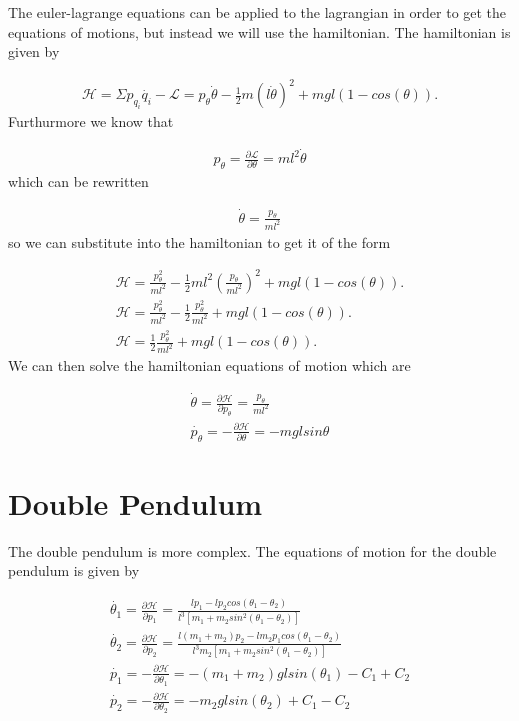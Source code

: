 \documentclass[12pt]{article}
\begin{document}
The euler-lagrange equations can be applied to the lagrangian in order to get the equations of motions, but instead we will use the hamiltonian. The hamiltonian is given by

\begin{gather}
\mathcal{H} = \Sigma p_{q_i} \dot{q_i} - \mathcal{L} =p_{\theta}\dot{\theta} - \frac{1}{2}m{(l\dot{\theta})}^2 + mgl(1 - cos(\theta)).
\end{gather}
Furthurmore we know that

\begin{gather}
p_{\theta} = \frac{\partial \mathcal{L}}{\partial \theta} = ml^2\dot{\theta}
\end{gather}
which can be rewritten

\begin{gather}
\dot{\theta} = \frac{p_{\theta}}{ml^2}
\end{gather}
so we can substitute into the hamiltonian to get it of the form 

\begin{gather}
\mathcal{H} =\frac{p_{\theta}^2}{ml^2} - \frac{1}{2}ml^2{(\frac{p_{\theta}}{ml^2})}^2 + mgl(1 - cos(\theta)).  \\
\mathcal{H} =\frac{p_{\theta}^2}{ml^2} - \frac{1}{2}{\frac{p_{\theta}^2}{ml^2}} + mgl(1 - cos(\theta)). \\
\mathcal{H} =\frac{1}{2}{\frac{p_{\theta}^2}{ml^2}} + mgl(1 - cos(\theta)).
\end{gather}
We can then solve the hamiltonian equations of motion which are

\begin{gather}
\dot{\theta} = \frac{\partial \mathcal{H}}{\partial p_{\theta}} = \frac{p_{\theta}}{ml^2} \\
\dot{p_{\theta}} = -\frac{\partial \mathcal{H}}{\partial \theta} = -mgl sin{\theta}
\end{gather}


\section{Double Pendulum}

The double pendulum is more complex. The equations of motion for the double pendulum is given by

\begin{gather}
\dot{\theta_1} = \frac{\partial \mathcal{H}}{\partial p_{1}} = \frac{lp_1-lp_2cos(\theta_1-\theta_2)}{l^3[m_1+m_2sin^2(\theta_1-\theta_2)]} \\
\dot{\theta_2} = \frac{\partial \mathcal{H}}{\partial p_{2}} = \frac{l(m_1+m_2)p_2-lm_2p_1cos(\theta_1-\theta_2)}{l^3m_2[m_1+m_2sin^2(\theta_1-\theta_2)]} \\
\dot{p_1} = -\frac{\partial \mathcal{H}}{\partial \theta_1} = -(m_1+m_2)glsin(\theta_1) - C_1 + C_2 \\
\dot{p_2} = -\frac{\partial \mathcal{H}}{\partial \theta_2} = -m_2glsin(\theta_2) + C_1 - C_2
\end{gather}
\end{document}
